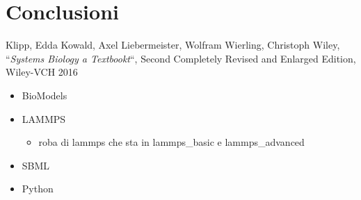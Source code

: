 \documentclass[Lau, oneside]{sapthesis}
\begin{document}
\chapter{Conclusioni}

\backmatter
{}
\begin{thebibliography}{17}

Klipp, Edda Kowald, Axel Liebermeister, Wolfram Wierling, Christoph Wiley,  “\textit{Systems Biology a Textbookt}“, Second Completely Revised and Enlarged Edition, Wiley-VCH 2016 

\begin{itemize}
    \item BioModels
    \item LAMMPS
    \begin{itemize}
        \item roba di lammps che sta in lammps\_basic e lammps\_advanced
    \end{itemize}
    \item SBML
    \item Python
\end{itemize}

\end{thebibliography}
\end{document}
